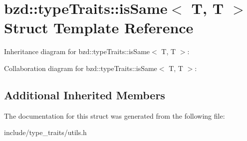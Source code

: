 \hypertarget{structbzd_1_1typeTraits_1_1isSame_3_01T_00_01T_01_4}{}\section{bzd\+:\+:type\+Traits\+:\+:is\+Same$<$ T, T $>$ Struct Template Reference}
\label{structbzd_1_1typeTraits_1_1isSame_3_01T_00_01T_01_4}


Inheritance diagram for bzd\+:\+:type\+Traits\+:\+:is\+Same$<$ T, T $>$\+:


Collaboration diagram for bzd\+:\+:type\+Traits\+:\+:is\+Same$<$ T, T $>$\+:
\subsection*{Additional Inherited Members}


The documentation for this struct was generated from the following file\+:\begin{DoxyCompactItemize}
\item 
include/type\+\_\+traits/utils.\+h\end{DoxyCompactItemize}
